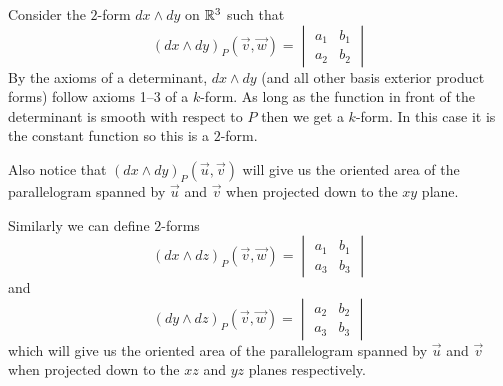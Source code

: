 \documentclass[notes]{subfiles}
\begin{document}
\begin{example}
    Consider the $2$-form $dx \wedge dy$ on $\mathbb{R}^3$ such that
    \[
        (dx \wedge dy)_P(\vec{v}, \vec{w}) =
        \begin{vmatrix}
            a_1 & b_1 \\
            a_2 & b_2
        \end{vmatrix}
    \]
    By the axioms of a determinant, $dx \wedge dy$ (and all other basis exterior product forms) follow axioms 1--3 of a $k$-form. As long as the function in front of the determinant is smooth with respect to $P$ then we get a $k$-form. In this case it is the constant function so this is a $2$-form.

    Also notice that $(dx \wedge dy)_P(\vec{u}, \vec{v})$ will give us the oriented area of the parallelogram spanned by $\vec{u}$ and $\vec{v}$ when projected down to the $xy$ plane.

    Similarly we can define $2$-forms
    \[
        (dx \wedge dz)_P(\vec{v}, \vec{w}) =
        \begin{vmatrix}
            a_1 & b_1 \\
            a_3 & b_3
        \end{vmatrix}
    \]
    and
    \[
        (dy \wedge dz)_P(\vec{v}, \vec{w}) =
        \begin{vmatrix}
            a_2 & b_2 \\
            a_3 & b_3
        \end{vmatrix}
    \]
    which will give us the oriented area of the parallelogram spanned by $\vec{u}$ and $\vec{v}$ when projected down to the $xz$ and $yz$ planes respectively.
\end{example}
\end{document}

